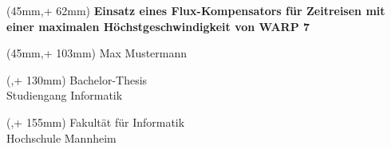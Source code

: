\thispagestyle{empty}

\newlength{\bindekorrektur}
\newlength{\seitenanfang}
\newlength{\seitenbreite}


\newcommand{\hsmatitel}{Einsatz eines Flux-Kompensators für Zeitreisen mit einer maximalen Höchstgeschwindigkeit von WARP 7}

\newcommand{\hsmaort}{Mannheim}
\newcommand{\hsmaauthor}{Max Mustermann}
\newcommand{\hsmadatum}{20.04.2012}
\newcommand{\hsmafirma}{Paukenschlag GmbH, Mannheim}
\newcommand{\hsmatyp}{Bachelor-Thesis}
\newcommand{\hsmastudiengang}{Informatik}
\newcommand{\hsmabetreuer}{Betreuer: Prof. Peter Mustermann}
\newcommand{\hsmazweitkorrektor}{Zweitkorrektor: Erika Mustermann}


\setlength{\bindekorrektur}{-46mm}   %
\setlength{\seitenanfang}{0mm}       %
\setlength{\seitenbreite}{297mm}


\begin{textblock*}{128mm}(45mm,\seitenanfang + 62mm) %
  \centering\huge\sf
  \vspace{4mm} %
  \textbf{\hsmatitel}
\end{textblock*}%

\begin{textblock*}{128mm}(45mm,\seitenanfang + 103mm)
  \centering\Large\sf
  \hsmaauthor
\end{textblock*}

\begin{textblock*}{\seitenbreite}(\bindekorrektur,\seitenanfang + 130mm)
  \centering\Large\sf
  \hsmatyp\\
  \vspace{2mm}
  Studiengang \hsmastudiengang
\end{textblock*}

\begin{textblock*}{\seitenbreite}(\bindekorrektur,\seitenanfang + 155mm)
  \centering\Large\sf
  Fakultät für Informatik\\
  \vspace{2mm}
  Hochschule Mannheim
\end{textblock*}

